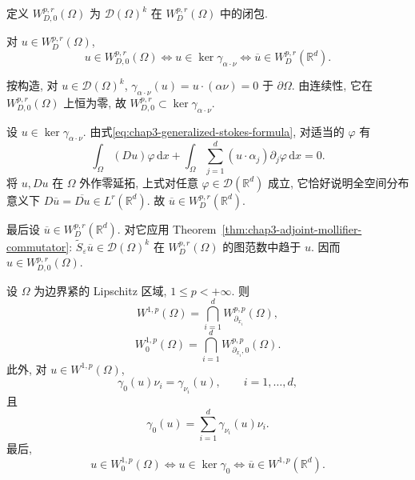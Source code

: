 \begin{Definition}
\label{def:chap3-zero-boundary-graph-space}
定义 $W_{D,0}^{p,r}(\Omega)$ 为 $\mathcal D(\Omega)^k$ 在 $W_D^{p,r}(\Omega)$ 中的闭包.
\end{Definition}

\begin{Theorem}
\label{thm:chap3-graph-space-zero-trace}
对 $u\in W_D^{p,r}(\Omega)$,
\[
 u\in W_{D,0}^{p,r}(\Omega)
 \Longleftrightarrow u\in\ker\gamma_{\alpha\cdot\nu}
 \Longleftrightarrow\overline u\in W_D^{p,r}(\mathbb R^d).
\]
\end{Theorem}

\begin{Proof}
按构造, 对 $u\in\mathcal D(\Omega)^k$, $\gamma_{\alpha\cdot\nu}(u)=u\cdot(\alpha\nu)=0$ 于 $\partial\Omega$. 由连续性, 它在 $W_{D,0}^{p,r}(\Omega)$ 上恒为零, 故 $W_{D,0}^{p,r}\subset\ker\gamma_{\alpha\cdot\nu}$.

设 $u\in\ker\gamma_{\alpha\cdot\nu}$. 由式\eqref{eq:chap3-generalized-stokes-formula}, 对适当的 $\varphi$ 有
\[
 \int_\Omega(Du)\varphi\,\mathrm dx
 +\int_\Omega\sum_{j=1}^d(u\cdot\alpha_j)\partial_j\varphi\,\mathrm dx=0.
\]
将 $u,Du$ 在 $\Omega$ 外作零延拓, 上式对任意 $\varphi\in\mathcal D(\mathbb R^d)$ 成立, 它恰好说明全空间分布意义下 $D\overline u=\overline{Du}\in L^r(\mathbb R^d)$. 故 $\overline u\in W_D^{p,r}(\mathbb R^d)$.

最后设 $\overline u\in W_D^{p,r}(\mathbb R^d)$. 对它应用 Theorem~\ref{thm:chap3-adjoint-mollifier-commutator}: $\widetilde S_\varepsilon\overline u\in\mathcal D(\Omega)^k$ 在 $W_D^{p,r}(\Omega)$ 的图范数中趋于 $u$. 因而 $u\in W_{D,0}^{p,r}(\Omega)$.
\end{Proof}

\begin{Theorem}
\label{thm:chap3-zero-trace-characterization}
设 $\Omega$ 为边界紧的 Lipschitz 区域, $1\leq p<+\infty$. 则
\begin{equation}
 W^{1,p}(\Omega)=\bigcap_{i=1}^dW_{\partial_{x_i}}^{p,p}(\Omega),
 \label{eq:chap3-sobolev-intersection-graph-spaces}
\end{equation}
\begin{equation}
 W_0^{1,p}(\Omega)=\bigcap_{i=1}^dW_{\partial_{x_i},0}^{p,p}(\Omega).
 \label{eq:chap3-zero-sobolev-intersection-graph-spaces}
\end{equation}
此外, 对 $u\in W^{1,p}(\Omega)$,
\begin{equation}
 \gamma_0(u)\nu_i=\gamma_{\nu_i}(u),\qquad i=1,\ldots,d,
 \label{eq:chap3-coordinate-normal-traces}
\end{equation}
且
\begin{equation}
 \gamma_0(u)=\sum_{i=1}^d\gamma_{\nu_i}(u)\nu_i.
 \label{eq:chap3-reconstruct-scalar-trace}
\end{equation}
最后,
\[
 u\in W_0^{1,p}(\Omega)
 \Longleftrightarrow u\in\ker\gamma_0
 \Longleftrightarrow\overline u\in W^{1,p}(\mathbb R^d).
\]
\end{Theorem}

